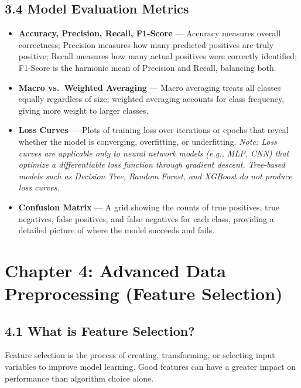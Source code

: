 \documentclass[12pt, a4paper]{article}
\begin{document}
\subsection*{3.4 Model Evaluation Metrics}
\begin{itemize}
    \item \textbf{Accuracy, Precision, Recall, F1-Score} --- Accuracy measures overall correctness; Precision measures how many predicted positives are truly positive; Recall measures how many actual positives were correctly identified; F1-Score is the harmonic mean of Precision and Recall, balancing both.
    \item \textbf{Macro vs.\ Weighted Averaging} --- Macro averaging treats all classes equally regardless of size; weighted averaging accounts for class frequency, giving more weight to larger classes.
    \item \textbf{Loss Curves} --- Plots of training loss over iterations or epochs that reveal whether the model is converging, overfitting, or underfitting. \textit{Note: Loss curves are applicable only to neural network models (e.g., MLP, CNN) that optimize a differentiable loss function through gradient descent. Tree-based models such as Decision Tree, Random Forest, and XGBoost do not produce loss curves.}
    \item \textbf{Confusion Matrix} --- A grid showing the counts of true positives, true negatives, false positives, and false negatives for each class, providing a detailed picture of where the model succeeds and fails.
\end{itemize}

\section*{Chapter 4: Advanced Data Preprocessing (Feature Selection)}

\subsection*{4.1 What is Feature Selection?}
Feature selection is the process of creating, transforming, or selecting input variables to improve model learning. Good features can have a greater impact on performance than algorithm choice alone.
\end{document}
